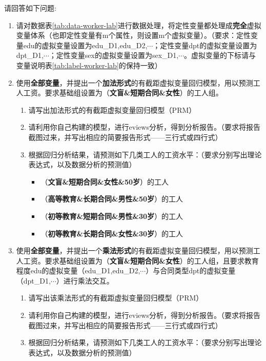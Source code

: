 \documentclass[12pt,(landscape,a4paper),(portrait,a4paper)]{article}
\providecommand{\tightlist}{%
  \setlength{\itemsep}{0pt}\setlength{\parskip}{0pt}}
\theoremstyle{definition}
\theoremstyle{definition}
\theoremstyle{definition}
\theoremstyle{remark}
\begin{document}
请回答如下问题:

\begin{enumerate}
\def\labelenumi{\arabic{enumi}.}
\item
  请对数据表\ref{tab:data-worker-lab}进行数据处理，将定性变量都处理成\textbf{完全}虚拟变量体系（也即定性变量有m个属性，则设置m个虚拟变量）。（要求：定性变量edu的虚拟变量设置为edu\_D1,edu\_D2,\(\cdots\)；定性变量dpt的虚拟变量设置为dpt\_D1,\(\cdots\)；定性变量sex的虚拟变量设置为sex\_D1,\(\cdots\)。虚拟变量的下标请与变量说明表\ref{tab:label-worker-lab}的保持一致）
\item
  使用\textbf{全部变量}，并提出一个\textbf{加法形式}的有截距虚拟变量回归模型，用以预测工人工资。要求基础组设置为（\textbf{文盲\&短期合同\&女性}）的工人组。

  \begin{enumerate}
  \def\labelenumii{\alph{enumii}.}
  \tightlist
  \item
    请写出加法形式的有截距虚拟变量回归模型（PRM）
  \item
    请利用你自己构建的模型，进行eviews分析，得到分析报告。（要求将报告截图过来，并写出相应的简要报告形式------三行式或四行式）
  \item
    根据回归分析结果，请预测如下几类工人的工资水平：（要求分别写出理论表达式，以及数据分析的预测值）

    \begin{itemize}
    \tightlist
    \item
      （\textbf{文盲\&短期合同\&女性\&50岁}）的工人
    \item
      （\textbf{高等教育\&长期合同\&男性\&50岁}）的工人
    \item
      （\textbf{初等教育\&短期合同\&男性\&30岁}）的工人
    \item
      （\textbf{初等教育\&长期合同\&女性\&30岁}）的工人
    \end{itemize}
  \end{enumerate}
\item
  使用\textbf{全部变量}，并提出一个\textbf{乘法形式}的有截距虚拟变量回归模型，用以预测工人工资。要求基础组设置为（\textbf{文盲\&短期合同\&女性}）的工人组，且要求教育程度edu的虚拟变量（edu\_D1,edu\_D2,\(\cdots\)）与合同类型dpt的虚拟变量（dpt\_D1,\(\cdots\)）进行乘法交互。

  \begin{enumerate}
  \def\labelenumii{\alph{enumii}.}
  \tightlist
  \item
    请写出该乘法形式的有截距虚拟变量回归模型（PRM）
  \item
    请利用你自己构建的模型，进行eviews分析，得到分析报告。（要求将报告截图过来，并写出相应的简要报告形式------三行式或四行式）
  \item
    根据回归分析结果，请预测如下几类工人的工资水平：（要求分别写出理论表达式，以及数据分析的预测值）


\end{enumerate}
\end{enumerate}
\end{document}
